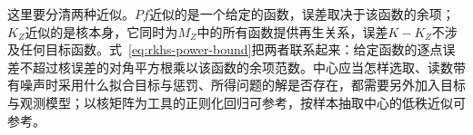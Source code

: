 这里要分清两种近似。$Pf$近似的是一个给定的函数，误差取决于该函数的余项；$K_Z$近似的是核本身，它同时为$M_Z$中的所有函数提供再生关系，误差$K-K_Z$不涉及任何目标函数。式~\eqref{eq:rkhs-power-bound}把两者联系起来：给定函数的逐点误差不超过核误差的对角平方根乘以该函数的余项范数。中心应当怎样选取、读数带有噪声时采用什么拟合目标与惩罚、所得问题的解是否存在，都需要另外加入目标与观测模型；以核矩阵为工具的正则化回归可参考，按样本抽取中心的低秩近似可参考。
